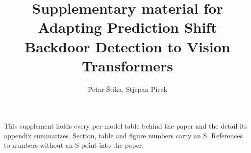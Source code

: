 \documentclass[10pt]{article}
\title{Supplementary material for\\Adapting Prediction Shift Backdoor Detection to Vision Transformers}
\author{Petar \v{S}tika, Stjepan Picek}
\date{}
\begin{document}
\maketitle

This supplement holds every per-model table behind the paper and the detail its
appendix summarizes. Section, table and figure numbers carry an S. References to
numbers without an S point into the paper.





\end{document}
